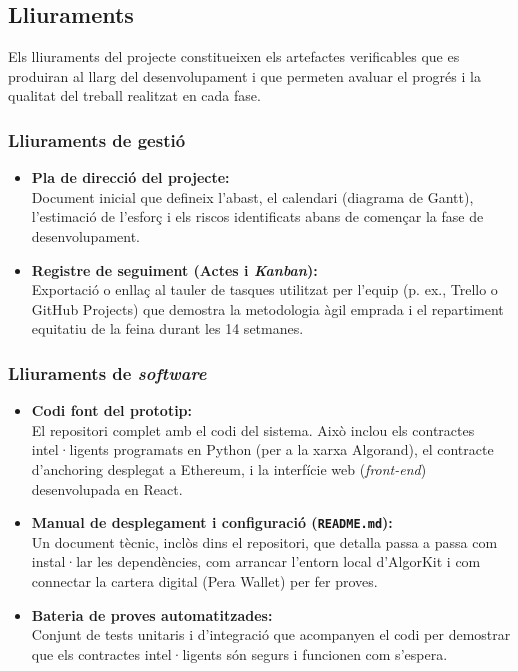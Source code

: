 \subsection{Lliuraments}

Els lliuraments del projecte constitueixen els artefactes verificables que es produiran al llarg del desenvolupament i que permeten avaluar el progrés i la qualitat del treball realitzat en cada fase.

\subsubsection{Lliuraments de gestió}
\begin{itemize}
    \item \textbf{Pla de direcció del projecte:} \\ Document inicial que defineix l'abast, el calendari (diagrama de Gantt), l'estimació de l'esforç i els riscos identificats abans de començar la fase de desenvolupament.
    
    \item \textbf{Registre de seguiment (Actes i \textit{Kanban}):} \\ Exportació o enllaç al tauler de tasques utilitzat per l'equip (p. ex., Trello o GitHub Projects) que demostra la metodologia àgil emprada i el repartiment equitatiu de la feina durant les 14 setmanes.
\end{itemize}

\subsubsection{Lliuraments de \textit{software}}
\begin{itemize}
    \item \textbf{Codi font del prototip:} \\ El repositori complet amb el codi del sistema. Això inclou els contractes intel·ligents programats en Python (per a la xarxa Algorand), el contracte d'anchoring desplegat a Ethereum, i la interfície web (\textit{front-end}) desenvolupada en React.
    \item \textbf{Manual de desplegament i configuració (\texttt{README.md}):} \\ Un document tècnic, inclòs dins el repositori, que detalla passa a passa com instal·lar les dependències, com arrancar l'entorn local d'AlgorKit i com connectar la cartera digital (Pera Wallet) per fer proves.
    \item \textbf{Bateria de proves automatitzades:} \\ Conjunt de tests unitaris i d'integració que acompanyen el codi per demostrar que els contractes intel·ligents són segurs i funcionen com s'espera.
\end{itemize}

